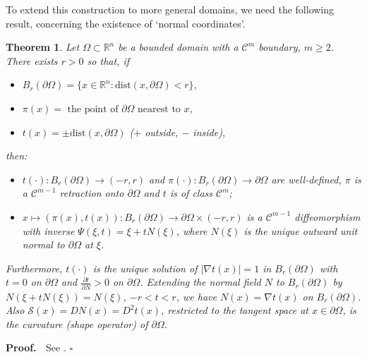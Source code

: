 \documentclass[a4paper,12pt]{amsart}
\newtheorem{theorem}{Theorem}[section]
\renewcommand{\proof}{{\noindent \bf Proof. \ }}
\newcommand{\eproof}{\hfill \mbox{${\square}$}}
\newcommand{\R}{\mathbb{R}}
\newcommand{\dist}{\textrm{dist}}
\begin{document}
 To extend this construction to more general domains, we  need the following result,  concerning the existence of
  `normal coordinates'.

\begin{theorem} \label{normal_neighborhood}  Let $ \Omega \subset \R^n$ be a {bounded} domain with a $\mathcal{C}^m$ boundary, $ m \geq 2$. There exists $r>0$ so that, if
  \begin{itemize}
  \item $B_r(\partial \Omega)= \{ x \in \R^n : \dist(x, \partial \Omega) < r  \}$,
 \item  $\pi(x) = \textrm{ the point of  }  \partial \Omega
 \textrm{ nearest to  } x  $,
 \item  $  t(x) =  \pm  \dist(x, \partial \Omega)$
  ($+$ outside, $-$ inside),
  \end{itemize}
then:
\begin{itemize}
\item  $ t(\cdot) : B_r(\partial \Omega) \to (-r,r) $ and
 $\pi(\cdot) :  B_r(\partial \Omega) \to \partial \Omega $ are
 well-defined,
 $\pi$ is  a $\mathcal{C}^{m-1} $ retraction onto
  $\partial \Omega$
and $t$ is of class $\mathcal{C}^{m} $;
 \item
$ x \mapsto  (\pi (x), t(x) ) :  B_r(\partial \Omega) \to \partial \Omega \times (-r,r)$  is a  $\mathcal{C}^{m-1} $
 diffeomorphism with inverse
$ \Psi(\xi, t) = \xi + t N(\xi)$,
 where $N(\xi) $ is the unique outward unit normal to $\partial \Omega$
  at $\xi$.
\end{itemize}
 \noindent Furthermore,
 $t(\cdot)$ is the unique solution of
 $| \nabla t(x)| = 1$ in   $B_r(\partial \Omega)$ with $t=0$ on
  $\partial \Omega$ and  $\frac{\partial t }{\partial  N } > 0 $ on  $\partial \Omega$.
  Extending the normal field $N$ to $B_r(\partial \Omega)$ by
$ N(\xi + t N(\xi) )= N(\xi)$, $-r <t < r $, we have
 $ N (x) = \nabla t(x)$  on $B_r (\partial \Omega).$ Also
 $ {\mathcal{S}} (x) = D N (x) = D^2 t(x)$, restricted to the tangent space at $ x  \in \partial \Omega$,  is the curvature {(shape operator)} of $\partial \Omega$.
\end{theorem}

\proof See \cite{henry}. \eproof
\end{document}
